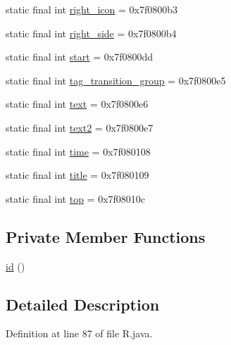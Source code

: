 \begin{DoxyCompactItemize}
\item 
static final int \mbox{\hyperlink{classandroid_1_1support_1_1fragment_1_1_r_1_1id_a84be6ee7a00f1c86ac4b3bbeafbbf062}{right\+\_\+icon}} = 0x7f0800b3
\item 
static final int \mbox{\hyperlink{classandroid_1_1support_1_1fragment_1_1_r_1_1id_a6c6229b22fccfc6575c602456877e7f0}{right\+\_\+side}} = 0x7f0800b4
\item 
static final int \mbox{\hyperlink{classandroid_1_1support_1_1fragment_1_1_r_1_1id_a2d344efe69cba66141e91e91672565c3}{start}} = 0x7f0800dd
\item 
static final int \mbox{\hyperlink{classandroid_1_1support_1_1fragment_1_1_r_1_1id_a71f552683eb16534008bbb886f1ebe6a}{tag\+\_\+transition\+\_\+group}} = 0x7f0800e5
\item 
static final int \mbox{\hyperlink{classandroid_1_1support_1_1fragment_1_1_r_1_1id_af59b862fcc030e013eeddbf37fad26c8}{text}} = 0x7f0800e6
\item 
static final int \mbox{\hyperlink{classandroid_1_1support_1_1fragment_1_1_r_1_1id_ac3ed7c283f93c713879d757672ced902}{text2}} = 0x7f0800e7
\item 
static final int \mbox{\hyperlink{classandroid_1_1support_1_1fragment_1_1_r_1_1id_a1ad4e0c77b0ba200bf2a633388897aae}{time}} = 0x7f080108
\item 
static final int \mbox{\hyperlink{classandroid_1_1support_1_1fragment_1_1_r_1_1id_a796ac9208dc3433c3ab2d7a45f9f35fb}{title}} = 0x7f080109
\item 
static final int \mbox{\hyperlink{classandroid_1_1support_1_1fragment_1_1_r_1_1id_a610fdd324f3b197216391211c720d444}{top}} = 0x7f08010c
\end{DoxyCompactItemize}
\subsection*{Private Member Functions}
\begin{DoxyCompactItemize}
\item 
\mbox{\hyperlink{classandroid_1_1support_1_1fragment_1_1_r_1_1id_a0c961d0bbdd4953713b06273a10ee8bf}{id}} ()
\end{DoxyCompactItemize}


\subsection{Detailed Description}


Definition at line 87 of file R.\+java.




